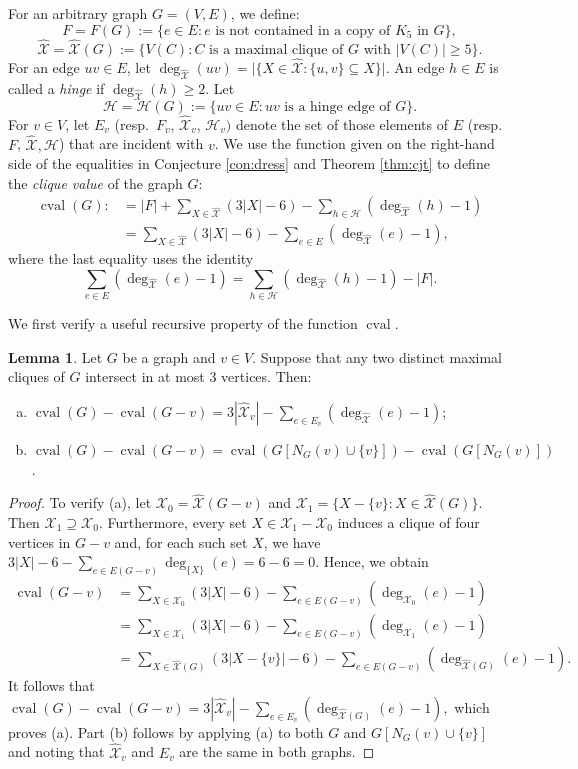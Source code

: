 \documentclass[11pt,a4paper]{article}
\theoremstyle{definition}
\newtheorem{lemma}[theorem]{Lemma}
\DeclareMathOperator{\cval}{cval}
\newcommand{\hXX}{\hat{\mathcal{X}}}
\begin{document}
For an arbitrary  graph $G=(V,E)$, we define:
$$F=F(G):=\{e\in E: e \text{ is not contained in a copy of } K_5 \text{ in }G\},$$
$$\hXX=\hat{\mathcal{X}}(G):=\{V(C): C \text{ is a maximal clique of $G$ with $|V(C)|\geq 5$}\}.$$
For an edge $uv\in E$, let $\deg_{\hXX}(uv)=\big|\{X\in \hXX:\{u,v\}\subseteq X\}\big|$. An edge $h\in E$ is called a {\it hinge} if  $\deg_{\hXX}(h)\geq 2$. Let
$$\mathcal{H}=\mathcal{H}(G):=\{uv\in E: uv \text{ is a hinge edge of } G\}.$$
For $v\in V$, let $E_v$ (resp.\ $F_v$, $\hXX_v$, $\mathcal{H}_v)$ denote the set of those elements of $E$ (resp.\ $F$, $\hXX, \mathcal{H}$) that are incident with $v$. 
We use the function given on the right-hand side of the equalities in Conjecture \ref{con:dress} and Theorem \ref{thm:cjt} to define the {\em clique value} of the graph $G$: 
\begin{align}
\cval(G):&
=|F|+\sum_{X\in \hXX}(3|X|-6)-\sum_{h\in \mathcal{H}}(\deg_{\hXX}(h)-1)\\
&=\sum_{X\in \hXX}(3|X|-6)-\sum_{e\in E}(\deg_{\hXX}(e)-1),
\end{align}
where the last equality uses the identity 
$$\sum_{e\in E}(\deg_{\hXX}(e)-1)=\sum_{h\in \mathcal{H}}(\deg_{\hXX}(h)-1)-|F|.$$



We first verify a useful recursive property of the function $\cval$. 

\begin{lemma}\label{lem:circuit:NGv}
Let $G$ be a graph and $v\in V$. Suppose that any two distinct maximal cliques of $G$ intersect in at most 3 vertices. Then: 
\begin{enumerate}[(a)]
\item $\cval(G)-\cval(G-v)= 3|\hXX_v|-\sum_{e\in E_v}(\deg_{\hXX}(e)-1)$; 

\item  $\cval(G)-\cval(G-v)=\cval(G[N_G(v)\cup \{v\}])-\cval(G[N_G(v)])$.
\end{enumerate}
\end{lemma}
\begin{proof} To verify (a), let $\mathcal{X}_0= \hXX(G-v)$ and $\mathcal{X}_1=\{X-\{v\}:X\in \hXX(G)\}$.
Then $\mathcal{X}_1\supseteq \mathcal{X}_0$. Furthermore, every set $X\in \mathcal{X}_1- \mathcal{X}_0$ induces a clique of four vertices in $G-v$ and, for each such set $X$, we have $3|X|-6-\sum_{e\in E(G-v)}\deg_{ \{X\}}(e)=6-6=0$.
Hence, we obtain
\begin{align}
\cval(G-v)
&=\sum_{X\in \mathcal{X}_0}(3|X|-6)-\sum_{e\in E(G-v)}(\deg_{\mathcal X_0}(e)-1)\\
&=\sum_{X\in \mathcal{X}_1}(3|X|-6)-\sum_{e\in E(G-v)}(\deg_{\mathcal X_1}(e)-1)\\
&=\sum_{X\in \hXX(G)}(3|X-\{v\}|-6)-\sum_{e\in E(G-v)}(\deg_{\mathcal \hXX(G)}(e)-1).
\end{align}
It follows that $\cval(G)-\cval(G-v)= 3|\hXX_v|-\sum_{e\in E_v}{(\deg_{\hXX(G)}(e)-1)},$ which proves (a).
Part (b) follows by applying (a) to both $G$ and $G[N_G(v)\cup \{v\}]$ and noting that $\hXX_v$ and $E_v$ are the same in both graphs.   			
\end{proof}
\end{document}
